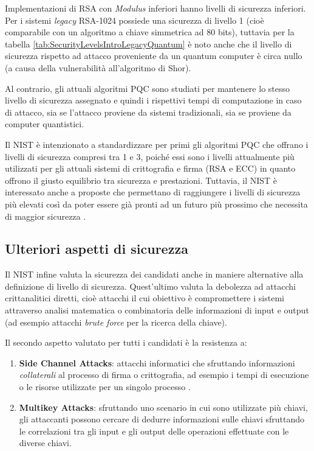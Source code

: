 Implementazioni di RSA con \textit{Modulus} inferiori hanno livelli di sicurezza inferiori. Per i sistemi \textit{legacy} RSA-1024 possiede una sicurezza di livello 1 (cioè comparabile con un algoritmo a chiave simmetrica ad 80 bits), tuttavia per la tabella \ref{tab:SecurityLevelsIntroLegacyQuantum} è noto anche che il livello di sicurezza rispetto ad attacco proveniente da un quantum computer è circa nullo (a causa della vulnerabilità all'algoritmo di Shor).

Al contrario, gli attuali algoritmi PQC sono studiati per mantenere lo stesso livello di sicurezza assegnato e quindi i rispettivi tempi di computazione in caso di attacco, sia se l'attacco proviene da sistemi tradizionali, sia se proviene da computer quantistici.

Il NIST è intenzionato a standardizzare per primi gli algoritmi PQC che offrano i livelli di sicurezza compresi tra 1 e 3, poiché essi sono i livelli attualmente più utilizzati per gli attuali sistemi di crittografia e firma (RSA e ECC) in quanto offrono il giusto equilibrio tra sicurezza e prestazioni. Tuttavia, il NIST è interessato anche a proposte che permettano di raggiungere i livelli di sicurezza più elevati così da poter essere già pronti ad un futuro più prossimo che necessita di maggior sicurezza \cite{NISTthirdReport}. 

\subsection{Ulteriori aspetti di sicurezza}

Il NIST infine valuta la sicurezza dei candidati anche in maniere alternative alla definizione di livello di sicurezza. Quest'ultimo valuta la debolezza ad attacchi crittanalitici diretti, cioè attacchi il cui obiettivo è compromettere i sistemi attraverso analisi matematica o combinatoria delle informazioni di input e output (ad esempio attacchi \textit{brute force} per la ricerca della chiave).

Il secondo aspetto valutato per tutti i candidati è la resistenza a:
\begin{enumerate}
    \item \textbf{Side Channel Attacks}: attacchi informatici che sfruttando informazioni \textit{collaterali} al processo di firma o crittografia, ad esempio i tempi di esecuzione o le risorse utilizzate per un singolo processo \cite{NISTthirdReport}.
    \item \textbf{Multikey Attacks}: sfruttando uno scenario in cui sono utilizzate più chiavi, gli attaccanti possono cercare di dedurre informazioni sulle chiavi sfruttando le correlazioni tra gli input e gli output delle operazioni effettuate con le diverse chiavi.
\end{enumerate}

